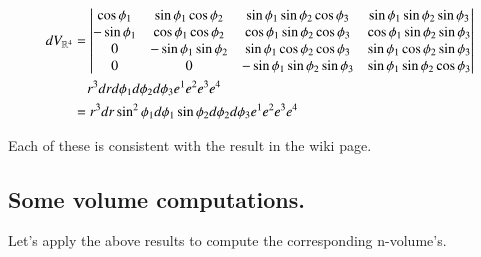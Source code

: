 \documentclass{article}
\begin{document}
\begin{align*}
dV_{\Rm{4}} &=
\begin{vmatrix}
\cos\phi_1 & \sin\phi_1 \cos\phi_2 & \sin\phi_1 \sin\phi_2 \cos\phi_3 & \sin\phi_1 \sin\phi_2 \sin\phi_3  \\
-\sin\phi_1 & \cos\phi_1 \cos\phi_2 & \cos\phi_1 \sin\phi_2 \cos\phi_3 & \cos\phi_1 \sin\phi_2 \sin\phi_3  \\
         0 & -\sin\phi_1 \sin\phi_2 & \sin\phi_1 \cos\phi_2 \cos\phi_3 & \sin\phi_1 \cos\phi_2 \sin\phi_3  \\
         0 &                     0 & -\sin\phi_1 \sin\phi_2 \sin\phi_3 & \sin\phi_1 \sin\phi_2 \cos\phi_3  \\
\end{vmatrix} \\
&\quad r^3 dr d\phi_1 d\phi_2 d\phi_3 e^1 e^2 e^3 e^4 \\
&=
%
%
%
%
%
%
%
%
r^3 dr \sin^2\phi_1 d\phi_1 \sin\phi_2 d\phi_2 d\phi_3 e^1 e^2 e^3 e^4 \\
\end{align*}

Each of these is consistent with the result in the wiki page.

\subsection{ Some volume computations. }

Let's apply the above results to compute the corresponding n-volume's.
\end{document}
